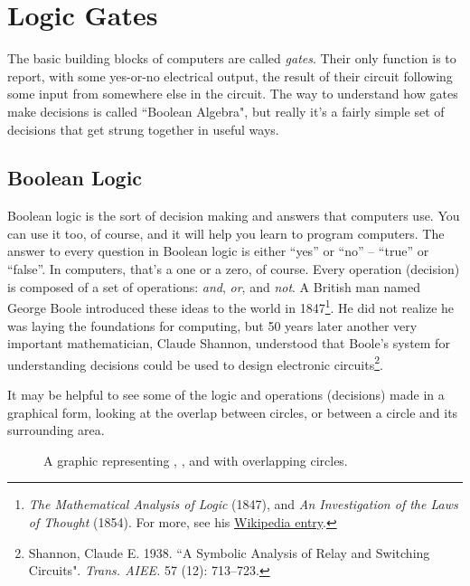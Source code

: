 \section{Logic Gates}

The basic building blocks of computers are called \emph{gates}. Their only function is to report, with some yes-or-no electrical output, the result of their circuit following some input from somewhere else in the circuit. The way to understand how gates make decisions is called ``Boolean Algebra", but really it's a fairly simple set of decisions that get strung together in useful ways.

\subsection*{Boolean Logic}

Boolean logic is the sort of decision making and answers that computers use. You can use it too, of course, and it will help you learn to program computers. The answer to every question in Boolean logic is either ``yes'' or ``no'' -- ``true'' or ``false''. In computers, that's a one or a zero, of course.   Every operation (decision) is composed of a set of operations: \emph{and}, \emph{or}, and \emph{not}. A British man named George Boole introduced these ideas to the world in 1847\footnote{
\emph{The Mathematical Analysis of Logic} (1847), and \emph{An Investigation of the Laws of Thought} (1854). For more, see his {\color{webblue}\href{https://en.wikipedia.org/wiki/George_Boole}{Wikipedia entry}}.}. He did not realize he was laying the foundations for computing, but 50 years later another very important mathematician, Claude Shannon, understood that Boole's system for understanding decisions could be used to design electronic circuits\footnote{Shannon, Claude E. 1938. ``A Symbolic Analysis of Relay and Switching Circuits". \emph{Trans. AIEE.} 57 (12): 713--723.}. 

It may be helpful to see some of the logic and operations (decisions) made in a graphical form, looking at the overlap between circles, or between a circle and its surrounding area.

\begin{figure}[!h]
\begin{center}

\caption{A graphic representing {}, {}, and {} with overlapping circles.}
\end{center}
\label{fig:vennlogic}
\end{figure}


